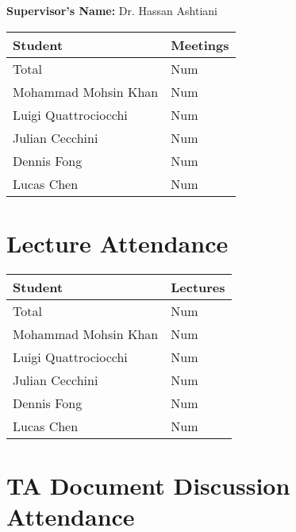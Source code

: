 \documentclass{article}
\begin{document}
\noindent \textbf{Supervisor's Name: } Dr. Hassan Ashtiani

\begin{table}[H]
\centering
\begin{tabular}{ll}
\toprule
\textbf{Student} & \textbf{Meetings}\\
\midrule
Total & Num\\
Mohammad Mohsin Khan & Num\\
Luigi Quattrociocchi & Num\\
Julian Cecchini & Num\\
Dennis Fong & Num\\
Lucas Chen & Num\\
\bottomrule
\end{tabular}
\end{table}


\section{Lecture Attendance}


\begin{table}[H]
\centering
\begin{tabular}{ll}
\toprule
\textbf{Student} & \textbf{Lectures}\\
\midrule
Total & Num\\
Mohammad Mohsin Khan & Num\\
Luigi Quattrociocchi & Num\\
Julian Cecchini & Num\\
Dennis Fong & Num\\
Lucas Chen & Num\\
\bottomrule
\end{tabular}
\end{table}


\section{TA Document Discussion Attendance}
\end{document}
